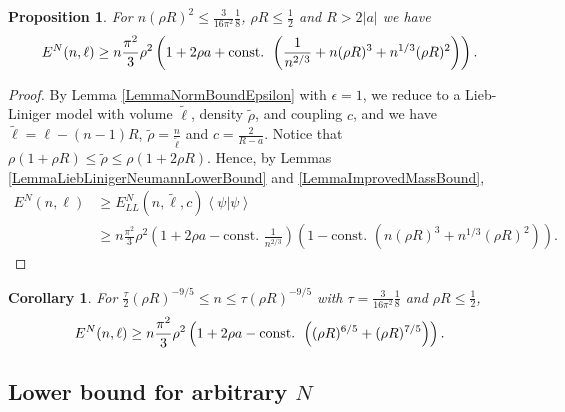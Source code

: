 \documentclass[a4paper,11pt]{article}
\newcommand{\abs}[1]{\left\lvert #1 \right\rvert}
\renewcommand{\braket}[1]{\left\langle#1\right\rangle}
\newtheorem{proposition}[theorem]{Proposition}
\newtheorem{corollary}[theorem]{Corollary}
\numberwithin{equation}{section}
\begin{document}
	\begin{proposition}
	\label{PropositionLowerBoundSpecN}
		For $ n(\rho R)^2\leq  \frac{3}{16\pi^2}\frac{1}{8} $, $ \rho R\leq \frac{1}{2} $ and $ R>2\abs{a} $ we have \begin{equation}
		E^N(n,\ell)\geq n\frac{\pi^2}{3}\rho^2\left(1+2\rho a+\textnormal{const. }\left(\frac{1}{n^{2/3}}+n(\rho R)^3+n^{1/3}(\rho R)^2\right)\right).
		\end{equation}
	\end{proposition}
	\begin{proof}
		By Lemma \ref{LemmaNormBoundEpsilon} with $ \epsilon=1 $, we reduce to a Lieb-Liniger model with volume $ \tilde{\ell} $, density $ \tilde{\rho} $, and coupling $ c $, and we have $ \tilde{\ell}=\ell-(n-1)R $, $ \tilde{\rho}=\frac{n}{\tilde{\ell}} $ and $ c=\frac{2}{R-a} $. Notice that $\rho(1+\rho R)\leq \tilde{\rho}\leq \rho(1+2\rho R)$. Hence, by Lemmas \ref{LemmaLiebLinigerNeumannLowerBound} and \ref{LemmaImprovedMassBound}, \begin{equation}
		\begin{aligned}
		E^N(n,\ell)&\geq E_{LL}^N(n,\tilde{\ell},c)\braket{\psi|\psi}\\&\geq
		n\frac{\pi^2}{3}\rho^2\left(1+2\rho a-\text{const. }\frac{1}{n^{2/3}}\right)\left(1-\text{const. }\left(n(\rho R)^3+n^{1/3}(\rho R)^2\right)\right).
		\end{aligned}
		\end{equation}
	\end{proof}
	\begin{corollary} \label{CorollaryLowerBoundSpecN}
		For $ \frac{\tau}{2} (\rho R)^{-9/5}\leq n\leq \tau (\rho R)^{-9/5} $ with $ \tau=\frac{3}{16\pi^2}\frac{1}{8} $ and $ \rho R\leq \frac{1}{2} $, 
		\begin{equation}
		E^N(n,\ell)\geq n\frac{\pi^2}{3}\rho^2\left(1+2\rho a-\textnormal{const. }\left((\rho R)^{6/5}+(\rho R)^{7/5}\right)\right).
		\end{equation}
	\end{corollary}
	\subsection{Lower bound for arbitrary $N$}
	\label{seclowboundarbn}
	
		 
\end{document}
